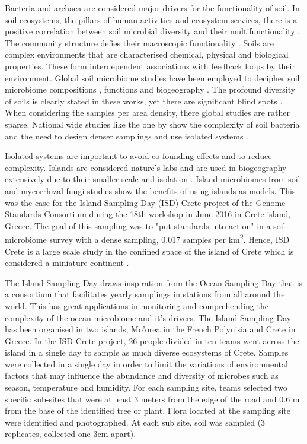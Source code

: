 Bacteria and archaea are considered major drivers for the functionality of soil.
In soil ecosystems, the pillars of human activities and ecosystem services, 
there is a positive correlation between soil microbial diversity and their multifunctionality \parencite{Delgado-Baquerizo2020}.
The community structure defies their macroscopic functionality \parencite{Bahram2018}.
Soils are complex environments that are characterised chemical, physical and biological properties. 
These form interdependent associations with feedback loops by their environment. 
Global soil microbiome studies have been employed to decipher soil microbiome
compositions \parencite{thompson2017a-communal, Delgado-Baquerizo-atlas, Labouyrie2023},
functions \parencite{Bahram2018} and biogeography \parencite{Martiny2006, guerra2020Blind}.
The profound diversity of soils is clearly stated in these works, yet there are
significant blind spots \parencite{guerra2020Blind}.
When considering the samples per area density, there global studies are rather sparse.
National wide studies like the one by \parencite{Karimi2020} show the
complexity of soil bacteria and the need to design 
denser samplings and use isolated systems \parencite{Dini-Andreote2021}.

Isolated systems are important to avoid co-founding effects and to reduce complexity.
Islands are considered nature's labs and are used in biogeography extensively due to their smaller scale and isolation \parencite{Whittaker2017}. 
Island microbiomes from soil \parencite{Li2020} and mycorrhizal fungi \parencite{Delavaux2021} studies
show the benefits of using islands as models.
This was the case for the Island Sampling Day (ISD) Crete project \parencite{holm2024}
of the Genome Standards Consortium \parencite{Field2011}
during the 18th workshop in June 2016 in Crete island, Greece. The goal of this sampling was to "put standards into action"
in a soil microbiome survey with a dense sampling, 0.017 samples per km\textsuperscript{2}.
Hence, ISD Crete is a large scale study in the confined space of the island of Crete which 
is considered a miniature continent \parencite{Vogiatzakis2008_crete}.

The Island Sampling Day draws inspiration from the Ocean Sampling Day \parencite{kopf_2015} that is a
consortium that facilitates yearly samplings in stations from all around the world.
This has great applications in monitoring and comprehending the complexity of the ocean microbiome and it’s drivers.
The Island Sampling Day has been organised in two islands, Mo'orea in the French Polynisia and Crete in Greece.
In the ISD Crete project, 26 people divided in ten teams went across the island in a single day to sample as much diverse 
ecosystems of Crete. 
Samples were collected in a single day in order to limit the variations of environmental
factors that may influence the abundance and diversity of microbes such as season,
temperature and humidity.
For each sampling site, teams selected two specific sub-sites that were
at least 3 meters from the edge of the road and 0.6 m from the base of
the identified tree or plant. Flora located at the sampling site were
identified and photographed.
At each sub site, soil was sampled (3 replicates, collected one 3cm apart). 

